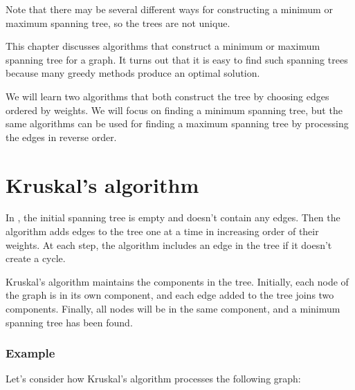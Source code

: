 Note that there may be several different ways
for constructing a minimum or maximum spanning tree,
so the trees are not unique.

This chapter discusses algorithms that construct
a minimum or maximum spanning tree for a graph.
It turns out that it is easy to find such spanning trees
because many greedy methods produce an optimal solution.

We will learn two algorithms that both construct the
tree by choosing edges ordered by weights.
We will focus on finding a minimum spanning tree,
but the same algorithms can be used for finding a
maximum spanning tree by processing the edges in reverse order.

\section{Kruskal's algorithm}


In , the initial spanning tree
is empty and doesn't contain any edges.
Then the algorithm adds edges to the tree
one at a time
in increasing order of their weights.
At each step, the algorithm includes an edge in the tree
if it doesn't create a cycle.

Kruskal's algorithm maintains the components
in the tree.
Initially, each node of the graph
is in its own component,
and each edge added to the tree joins two components.
Finally, all nodes will be in the same component,
and a minimum spanning tree has been found.

\subsubsection{Example}

\begin{samepage}
Let's consider how Kruskal's algorithm processes the
following graph:
\begin{center}
\end{center}
\end{samepage}

